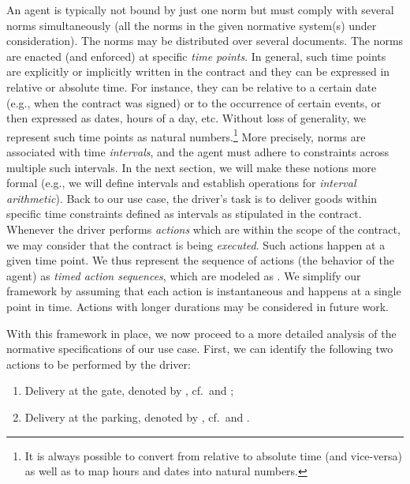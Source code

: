 An agent is typically not bound by just one norm but must comply with several norms simultaneously (all the norms in the given normative system(s) under consideration). The norms may be distributed over several documents.
The norms are enacted (and enforced) at specific \emph{time points}. In general, such time points are explicitly or implicitly written in the contract and they can be expressed in relative or absolute time. For instance, they can be relative to a certain date (e.g., when the contract was signed) or to the occurrence of certain events, or then expressed as dates, hours of a day, etc. Without loss of generality, we represent such time points as natural numbers.\footnote{It is always possible to convert from relative to absolute time (and vice-versa) as well as to map hours and dates into natural numbers.} More precisely, norms are associated with time \emph{intervals}, and the agent must adhere to constraints across multiple such intervals. In the next section, we will make these notions more formal (e.g., we will define intervals and establish operations for \emph{interval arithmetic}).
Back to our use case, the driver's task is to deliver goods within specific time constraints defined as intervals as stipulated in the contract. Whenever the driver performs \emph{actions} which are within the scope of the contract, we may consider that the contract is being \emph{executed}. Such actions happen at a given time point. We thus represent the sequence of actions (the behavior of the agent) as \emph{timed action sequences}, which are modeled as \emph{\timedwords}. We simplify our framework by assuming that each action is instantaneous and happens at a single point in time. Actions with longer durations may be considered in future work.

With this framework in place, we now proceed to a more detailed analysis of the normative specifications of our use case. First, we can identify the following two actions to be performed by the driver:

\begin{enumerate}
    \item Delivery at the gate, denoted by \delAtGate, cf.~\DC and \MA;
    \item Delivery at the parking, denoted by \delAtPark, cf.~\DC and \SR.
\end{enumerate}

